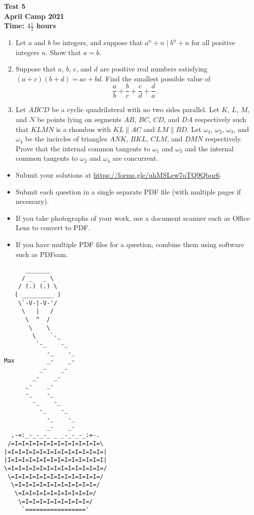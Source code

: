 \documentclass{article}
\begin{document}
\thispagestyle{empty}

\begin{center}
  \textbf{\Large Test 5}
  \\ \vspace{1em}
  \textbf{\large April Camp 2021}
  \\ \vspace{1em}
  \textbf{\large Time: $4\frac{1}{2}$ hours}
\end{center}

\vfill

\begin{enumerate}[leftmargin=0pt, itemsep=18pt]

\item
Let $a$ and $b$ be integers, and suppose that $a^n + n \mid b^n + n$ for all positive integers $n$. Show that $a = b$.


\item %
Suppose that $a$, $b$, $c$, and $d$ are positive real numbers satisfying $(a+c) (b+d) = ac +bd$.
Find the smallest possible value of
\[ \frac{a}{b} +\frac{b}{c} +\frac{c}{d} +\frac{d}{a}. \]


\item %
Let $ABCD$ be a cyclic quadrilateral with no two sides parallel.
Let $K$, $L$, $M$, and $N$ be points lying on segments $AB$, $BC$, $CD$, and $DA$ respectively such that $KLMN$ is a rhombus with $KL \parallel AC$ and $LM \parallel BD$.
Let $\omega_1$, $\omega_2$, $\omega_3$, and $\omega_4$ be the incircles of triangles $ANK$, $BKL$, $CLM$, and $DMN$ respectively.
Prove that the internal common tangents to $\omega_1$ and $\omega_3$ and the internal common tangents to $\omega_2$ and $\omega_4$ are concurrent.

\end{enumerate}


\vfill
\vfill
\begin{itemize}
	\item Submit your solutions at \url{https://forms.gle/uhMSLew7qTQ9Qbqr6}.
	\item Submit each question in a single separate PDF file (with multiple pages if necessary).
	\item If you take photographs of your work, use a document scanner such as Office Lens to convert to PDF.
	\item If you have multiple PDF files for a question, combine them using software such as PDFsam.
\end{itemize}

\vfill
\centering
\scriptsize
\begin{BVerbatim}
      _______
     / _   _ \
    / (.) (.) \
   ( _________ )
    \`-V-|-V-'/
     \   |   /
      \  ^  /
       \    \
        \    `-_
         `-_    -_
            -_    -_
Max         _-    _-
          _-    _-
        _-    _-
      _-    _-
      -_    -_
        -_    -_
          -_    -_
            -_    -_
            _-    _-
  ,-=:_-_-_-_ _ _-_-_-_:=-.
 /=I=I=I=I=I=I=I=I=I=I=I=I=\
|=I=I=I=I=I=I=I=I=I=I=I=I=I=|
|I=I=I=I=I=I=I=I=I=I=I=I=I=I|
\=I=I=I=I=I=I=I=I=I=I=I=I=I=/
 \=I=I=I=I=I=I=I=I=I=I=I=I=/
  \=I=I=I=I=I=I=I=I=I=I=I=/
   \=I=I=I=I=I=I=I=I=I=I=/
    \=I=I=I=I=I=I=I=I=I=/
     `================='
\end{BVerbatim}
\end{document}

